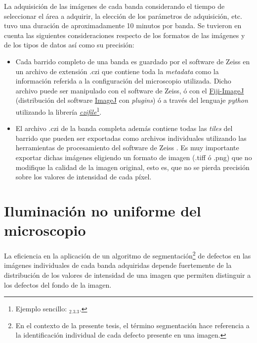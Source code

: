 La adquisición de las imágenes de cada banda considerando el tiempo de seleccionar el área a adquirir, la elección de los parámetros de adquisición, etc. tuvo una duración de aproximadamente 10 minutos por banda. Se tuvieron en cuenta las siguientes consideraciones respecto de los formatos de las imágenes y de los tipos de datos así como su precisión:
\begin{itemize}
\justifying
\item Cada barrido completo de una banda es guardado por el software de Zeiss en un archivo de extensión .czi que contiene toda la \textit{metadata} como la información referida a la configuración del microscopio utilizada. Dicho archivo puede ser manipulado con el software de Zeiss, ó con el \href{https://imagej.net/Fiji}{Fiji-ImageJ} (distribución del software \href{https://imagej.nih.gov/ij/}{ImageJ} con \textit{plugins}) ó a través del lenguaje \textit{python} utilizando la librería \href{https://pypi.org/project/czifile/}{\textit{czifile}}\footnote{Ejemplo sencillo: \href{https://github.com/jrr1984/defects_analysis/blob/master/zeiss_cfi.ipynb}{\faGithub$_{2.3.3}$}.}.
\item El archivo .czi de la banda completa además contiene todas las \textit{tiles} del barrido que pueden ser exportadas como archivos individuales utilizando las herramientas de procesamiento del software de Zeiss \cite{tilezeiss}. Es muy importante exportar dichas imágenes eligiendo un formato de imagen (.tiff ó .png) que no modifique la calidad de la imagen original, esto es, que no se pierda precisión sobre los valores de intensidad de cada píxel. 
\end{itemize}

\singlespacing
\section{Iluminación no uniforme del microscopio}
\label{sec:ilumnou}

\hspace{0.5cm}La eficiencia en la aplicación de un algoritmo de segmentación\footnote{En el contexto de la presente tesis, el término segmentación hace referencia a la identificación individual de cada defecto presente en una imagen.} de defectos en las imágenes individuales de cada banda adquiridas depende fuertemente de la distribución de los valores de intensidad de una imagen que permiten distinguir a los defectos del fondo de la imagen.

